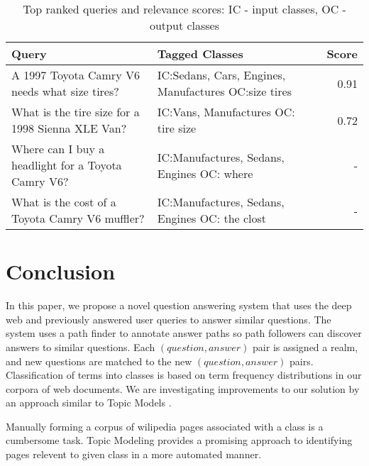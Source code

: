 \begin{table}[h]\footnotesize

\begin{tabular}{| p{3.5cm} | p{3cm} | r |}
\hline
Query & Tagged Classes & Score\\ \hline
A 1997 Toyota Camry V6 needs what size tires? & IC:Sedans, Cars, Engines, Manufactures OC:size tires & 0.91\\ \hline 
What is the tire size for a 1998 Sienna XLE Van? & IC:Vans, Manufactures OC: tire size & 0.72\\ \hline 
Where can I buy a headlight for a Toyota Camry V6? & IC:Manufactures, Sedans, Engines OC: where & - \\ \hline 
What is the cost of a Toyota Camry V6 muffler? &  IC:Manufactures, Sedans, Engines OC: the clost  & - \\ \hline
\end{tabular}

\caption{Top ranked queries and relevance scores: IC - input classes, OC - output classes}
\label{tbl:ranked_queries}   

\end{table}


\section{Conclusion}

In this paper, we propose a novel question answering system that uses the deep web and previously answered user queries to answer similar questions. The system uses a path finder to annotate answer paths so path followers can discover answers to similar questions.  Each $(question, answer)$ pair is assigned a realm, and new questions are matched to the new $(question, answer)$ pairs. Classification of terms into classes is based on term frequency distributions in our corpora of web documents. We are investigating improvements to our solution by an approach similar to Topic Models \cite{Blei2003latentdirichlet}. 

Manually forming a corpus of wilipedia pages associated with a class is a cumbersome task. Topic Modeling provides a promising approach to identifying pages relevent to given class in a more automated manner.
 


